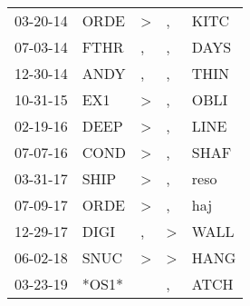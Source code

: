 \begin{supertabular}{p{0.07\textwidth}p{0.06\textwidth}p{0.02\textwidth}p{0.02\textwidth}p{0.06\textwidth}}
          03-20-14\textsuperscript{} &           ORDE\textsuperscript{} &     \textgreater &                , &           KITC\textsuperscript{} \\
          07-03-14\textsuperscript{} &           FTHR\textsuperscript{} &                , &                , &           DAYS\textsuperscript{} \\
          12-30-14\textsuperscript{} &           ANDY\textsuperscript{} &                , &                , &           THIN\textsuperscript{} \\
          10-31-15\textsuperscript{} &            EX1\textsuperscript{} &     \textgreater &                , &           OBLI\textsuperscript{} \\
          02-19-16\textsuperscript{} &           DEEP\textsuperscript{} &     \textgreater &                , &           LINE\textsuperscript{} \\
          07-07-16\textsuperscript{} &           COND\textsuperscript{} &     \textgreater &                , &           SHAF\textsuperscript{} \\
          03-31-17\textsuperscript{} &           SHIP\textsuperscript{} &     \textgreater &                , &           reso\textsuperscript{} \\
          07-09-17\textsuperscript{} &           ORDE\textsuperscript{} &     \textgreater &                , &            haj\textsuperscript{} \\
          12-29-17\textsuperscript{} &           DIGI\textsuperscript{} &                , &     \textgreater &           WALL\textsuperscript{} \\
          06-02-18\textsuperscript{} &           SNUC\textsuperscript{} &     \textgreater &     \textgreater &           HANG\textsuperscript{} \\
          03-23-19\textsuperscript{} &                            *OS1* &                  &                , &           ATCH\textsuperscript{} \\
\end{supertabular}
